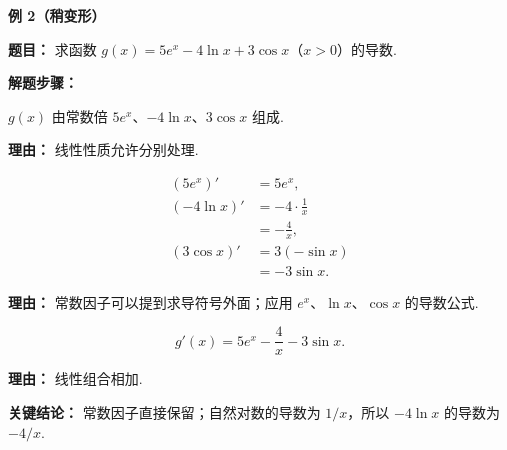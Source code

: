 \begin{examplebox}
\begin{minipage}{\linewidth}
\textbf{\textcolor{CExample}{例 2（稍变形）}}

	\textbf{\textcolor{CExample}{题目：}}
	求函数 $g(x) = 5e^x - 4\ln x + 3\cos x$（$x>0$）的导数.


\end{minipage}

	\textbf{\textcolor{CExample}{解题步骤：}}
	\begin{description}[style=nextline, leftmargin=2.8em, labelsep=0.5em, itemsep=0.45em]
		\item[\textbf{第一步（识别类型）：}] $g(x)$ 由常数倍 $5e^x$、$-4\ln x$、$3\cos x$ 组成.
			\par\textbf{理由：} 线性性质允许分别处理.

		\item[\textbf{第二步（逐项求导）：}]
			\[
				\begin{aligned}
					(5e^x)' &= 5e^x, \\
					(-4\ln x)' &= -4\cdot\frac{1}{x} \\
					&= -\frac{4}{x}, \\
					(3\cos x)' &= 3(-\sin x) \\
					&= -3\sin x.
			\end{aligned}
			\]
			\par\textbf{理由：} 常数因子可以提到求导符号外面；应用 $e^x$、$\ln x$、$\cos x$ 的导数公式.

		\item[\textbf{第三步（组合结果）：}]
			\[
				g'(x) = 5e^x - \frac{4}{x} - 3\sin x.
			\]
			\par\textbf{理由：} 线性组合相加.
	\end{description}

	\textbf{\textcolor{CExample}{关键结论：}}
	常数因子直接保留；自然对数的导数为 $1/x$，所以 $-4\ln x$ 的导数为 $-4/x$.

	\medskip
\end{examplebox}

